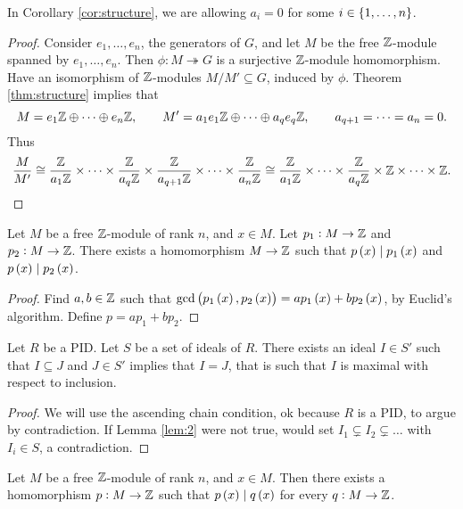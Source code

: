 \begin{remark*}
In Corollary \ref{cor:structure}, we are allowing $ a_i = 0 $ for some $ i \in \cbr{1, \dots, n} $.
\end{remark*}

\begin{proof}
Consider $ e_1, \dots, e_n $, the generators of $ G $, and let $ M $ be the free $ \mathbb{Z} $-module spanned by $ e_1, \dots, e_n $. Then $ \phi : M \twoheadrightarrow G $ is a surjective $ \mathbb{Z} $-module homomorphism. Have an isomorphism of $ \mathbb{Z} $-modules $ M / M' \subseteq G $, induced by $ \phi $. Theorem \ref{thm:structure} implies that
$$ M = e_1\mathbb{Z} \oplus \dots \oplus e_n\mathbb{Z}, \qquad M' = a_1e_1\mathbb{Z} \oplus \dots \oplus a_qe_q\mathbb{Z}, \qquad a_{q + 1} = \dots = a_n = 0. $$
Thus
$$ \dfrac{M}{M'} \cong \dfrac{\mathbb{Z}}{a_1\mathbb{Z}} \times \dots \times \dfrac{\mathbb{Z}}{a_q\mathbb{Z}} \times \dfrac{\mathbb{Z}}{a_{q + 1}\mathbb{Z}} \times \dots \times \dfrac{\mathbb{Z}}{a_n\mathbb{Z}} \cong \dfrac{\mathbb{Z}}{a_1\mathbb{Z}} \times \dots \times \dfrac{\mathbb{Z}}{a_q\mathbb{Z}} \times \mathbb{Z} \times \dots \times \mathbb{Z}. $$
\end{proof}

\begin{lemma}
\label{lem:1}
Let $ M $ be a free $ \mathbb{Z} $-module of rank $ n $, and $ x \in M $. Let $ p_1 : M \to \mathbb{Z} $ and $ p_2 : M \to \mathbb{Z} $. There exists a homomorphism $ M \to \mathbb{Z} $ such that $ p\br{x} \mid p_1\br{x} $ and $ p\br{x} \mid p_2\br{x} $.
\end{lemma}

\begin{proof}
Find $ a, b \in \mathbb{Z} $ such that $ \gcd\br{p_1\br{x}, p_2\br{x}} = ap_1\br{x} + bp_2\br{x} $, by Euclid's algorithm. Define $ p = ap_1 + bp_2 $.
\end{proof}

\begin{lemma}
\label{lem:2}
Let $ R $ be a PID. Let $ S $ be a set of ideals of $ R $. There exists an ideal $ I \in S' $ such that $ I \subseteq J $ and $ J \in S' $ implies that $ I = J $, that is such that $ I $ is maximal with respect to inclusion.
\end{lemma}

\begin{proof}
We will use the ascending chain condition, ok because $ R $ is a PID, to argue by contradiction. If Lemma \ref{lem:2} were not true, would set $ I_1 \subsetneq I_2 \subsetneq \dots $ with $ I_i \in S $, a contradiction.
\end{proof}

\begin{lemma}
\label{lem:3}
Let $ M $ be a free $ \mathbb{Z} $-module of rank $ n $, and $ x \in M $. Then there exists a homomorphism $ p : M \to \mathbb{Z} $ such that $ p\br{x} \mid q\br{x} $ for every $ q : M \to \mathbb{Z} $.
\end{lemma}

